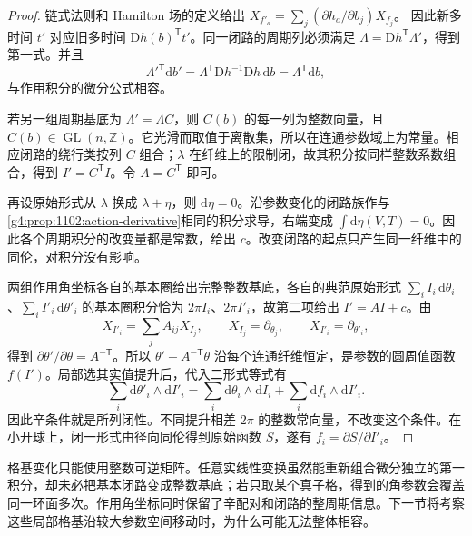 \begin{proof}
	链式法则和 Hamilton 场的定义给出
	\(X_{f'_a}=\sum_j(\partial h_a/\partial b_j)X_{f_j}\)。
	因此新多时间 \(t'\) 对应旧多时间 \(\mathrm{D}h(b)^{\mathsf T}t'\)。同一闭路的周期列必须满足
	\(\Lambda=\mathrm{D}h^{\mathsf T}\Lambda'\)，得到第一式。并且
	\[
		\Lambda'^{\mathsf T}\mathrm{d}b'
		=\Lambda^{\mathsf T}\mathrm{D}h^{-1}\mathrm{D}h\,\mathrm{d}b
		=\Lambda^{\mathsf T}\mathrm{d}b,
	\]
	与作用积分的微分公式相容。

	若另一组周期基底为 \(\Lambda'=\Lambda C\)，则 \(C(b)\) 的每一列为整数向量，且 \(C(b)\in\operatorname{GL}(n,\mathbb Z)\)。它光滑而取值于离散集，所以在连通参数域上为常量。相应闭路的绕行类按列 \(C\) 组合；\(\lambda\) 在纤维上的限制闭，故其积分按同样整数系数组合，得到 \(I'=C^{\mathsf T}I\)。令 \(A=C^{\mathsf T}\) 即可。

	再设原始形式从 \(\lambda\) 换成 \(\lambda+\eta\)，则 \(\mathrm{d}\eta=0\)。沿参数变化的闭路族作与\cref{g4:prop:1102:action-derivative}相同的积分求导，右端变成 \(\int\mathrm{d}\eta(V,T)=0\)。因此各个周期积分的改变量都是常数，给出 \(c\)。改变闭路的起点只产生同一纤维中的同伦，对积分没有影响。

	两组作用角坐标各自的基本圈给出完整整数基底，各自的典范原始形式 \(\sum_i I_i\,\mathrm{d}\theta_i\)、\(\sum_i I'_i\,\mathrm{d}\theta'_i\) 的基本圈积分恰为 \(2\pi I_i\)、\(2\pi I'_i\)，故第二项给出 \(I'=AI+c\)。由
	\[
		X_{I'_i}=\sum_j A_{ij}X_{I_j},\qquad
		X_{I_j}=\partial_{\theta_j},\qquad
		X_{I'_i}=\partial_{\theta'_i},
	\]
	得到 \(\partial\theta'/\partial\theta=A^{-\mathsf T}\)。所以
	\(\theta'-A^{-\mathsf T}\theta\) 沿每个连通纤维恒定，是参数的圆周值函数 \(f(I')\)。局部选其实值提升后，代入二形式等式有
	\[
		\sum_i\mathrm{d}\theta'_i\wedge\mathrm{d}I'_i
		=\sum_i\mathrm{d}\theta_i\wedge\mathrm{d}I_i
		 +\sum_i\mathrm{d}f_i\wedge\mathrm{d}I'_i.
	\]
	因此辛条件就是所列闭性。不同提升相差 \(2\pi\) 的整数常向量，不改变这个条件。在小开球上，闭一形式由径向同伦得到原始函数 \(S\)，遂有 \(f_i=\partial S/\partial I'_i\)。
\end{proof}

格基变化只能使用整数可逆矩阵。任意实线性变换虽然能重新组合微分独立的第一积分，却未必把基本闭路变成整数基底；若只取某个真子格，得到的角参数会覆盖同一环面多次。作用角坐标同时保留了辛配对和闭路的整周期信息。下一节将考察这些局部格基沿较大参数空间移动时，为什么可能无法整体相容。

